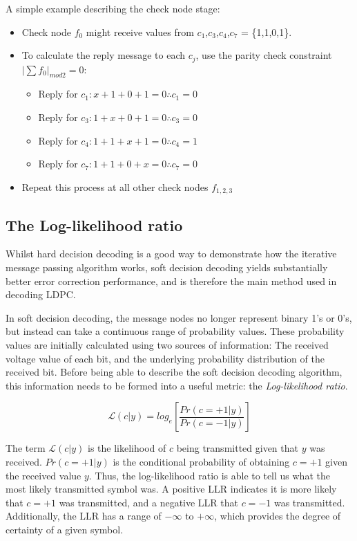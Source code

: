 \documentclass[11pt]{article}
\numberwithin{equation}{subsection}
\begin{document}
\noindent A simple example describing the check node stage:
\begin{itemize}
\item Check node $f_0$ might receive values from $c_1$,$c_3$,$c_4$,$c_7$ = \{1,1,0,1\}.
\item To calculate the reply message to each $c_j$, use the parity check constraint $\lvert \sum f_0 \rvert_{mod2} = 0$:
\begin{itemize}
\item Reply for $c_1 : x + 1 + 0 + 1 = 0 \therefore c_1 = 0$ 
\item Reply for $c_3 : 1 + x + 0 + 1 = 0 \therefore c_3 = 0$ 
\item Reply for $c_4 : 1 + 1 + x + 1 = 0 \therefore c_4 = 1$ 
\item Reply for $c_7 : 1 + 1 + 0 + x = 0 \therefore c_7 = 0$
\end{itemize}
\item Repeat this process at all other check nodes $f_{1,2,3}$
\end{itemize}

\subsection{The Log-likelihood ratio} \label{section:LLR}
Whilst hard decision decoding is a good way to demonstrate how the iterative message passing algorithm works, soft decision decoding yields substantially better error correction performance, and is therefore the main method used in decoding LDPC.

In soft decision decoding, the message nodes no longer represent binary 1's or 0's, but instead can take a continuous range of probability values. These probability values are initially calculated using two sources of information: The received voltage value of each bit, and the underlying probability distribution of the received bit. Before being able to describe the soft decision decoding algorithm, this information needs to be formed into a useful metric: the \textit{Log-likelihood ratio}.

\begin{equation} \label{eq:LLR}
\mathcal{L}(c|y) = log_e \left[ \dfrac{Pr(c=+1|y)}{Pr(c=-1|y)} \right]
\end{equation}

\noindent The term $\mathcal{L}(c|y)$ \cite{cho2012analysis} is the likelihood of $c$ being transmitted given that $y$ was received. $Pr(c=+1|y)$ is the conditional probability of obtaining $c=+1$ given the received value $y$. Thus, the log-likelihood ratio is able to tell us what the most likely transmitted symbol was. A positive LLR indicates it is more likely that $c=+1$ was transmitted, and a negative LLR that $c=-1$ was transmitted. Additionally, the LLR has a range of $-\infty$ to $+\infty$, which provides the degree of certainty of a given symbol.
\end{document}

